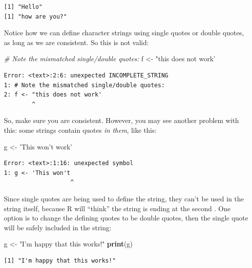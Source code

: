 \documentclass[
]{article}
\newenvironment{Shaded}{\begin{snugshade}}{\end{snugshade}}
\newcommand{\CommentTok}[1]{\textcolor[rgb]{0.56,0.35,0.01}{\textit{#1}}}
\newcommand{\KeywordTok}[1]{\textcolor[rgb]{0.13,0.29,0.53}{\textbf{#1}}}
\newcommand{\NormalTok}[1]{#1}
\newcommand{\StringTok}[1]{\textcolor[rgb]{0.31,0.60,0.02}{#1}}
\begin{document}
\begin{verbatim}
[1] "Hello"
[1] "how are you?"
\end{verbatim}

Notice how we can define character strings using single quotes or double quotes, as long as we are consistent.
So this is not valid:

\begin{Shaded}
\begin{Highlighting}[]
\CommentTok{# Note the mismatched single/double quotes:}
\NormalTok{f <-}\StringTok{ "this does not work' }
\end{Highlighting}
\end{Shaded}

\begin{verbatim}
Error: <text>:2:6: unexpected INCOMPLETE_STRING
1: # Note the mismatched single/double quotes:
2: f <- "this does not work' 
        ^
\end{verbatim}

So, make sure you are consistent.
However, you may see another problem with this: some strings contain quotes \emph{in them}, like this:

\begin{Shaded}
\begin{Highlighting}[]
\NormalTok{g <-}\StringTok{ 'This won'}\NormalTok{t work}\StringTok{'}
\end{Highlighting}
\end{Shaded}

\begin{verbatim}
Error: <text>:1:16: unexpected symbol
1: g <- 'This won't
                   ^
\end{verbatim}

Since single quotes are being used to define the string, they can't be used in the string itself, because R will ``think'' the string is ending at the second \texttt{\textquotesingle{}}.
One option is to change the defining quotes to be double quotes, then the single quote will be safely included in the string:

\begin{Shaded}
\begin{Highlighting}[]
\NormalTok{g <-}\StringTok{ "I'm happy that this works!"}
\KeywordTok{print}\NormalTok{(g)}
\end{Highlighting}
\end{Shaded}

\begin{verbatim}
[1] "I'm happy that this works!"
\end{verbatim}
\end{document}
